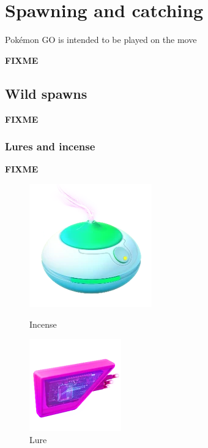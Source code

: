 \chapter{Spawning and catching}
Pokémon GO is intended to be played on the move

\label{chap:spawn}
\textbf{FIXME}

\section{Wild spawns}
\label{sec:spawns}
\textbf{FIXME}

\subsection{Lures and incense}
\textbf{FIXME}
\begin{figure}[h!]
  \begin{minipage}[t]{0.5\textwidth}
    \begin{center}
    \includegraphics[scale=.4]{images/incense.png}
    \end{center}
    \caption{Incense}
    \label{fig:incense}
  \end{minipage}
  \begin{minipage}[t]{0.5\textwidth}
    \begin{center}
    \includegraphics[scale=.4]{images/lure.png}
    \end{center}
    \caption[Lure module]{Lure}
    \label{fig:lure}
  \end{minipage}
\end{figure}

